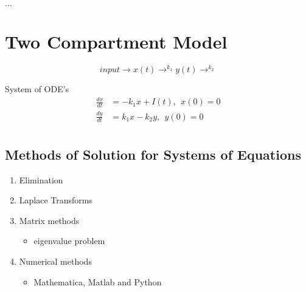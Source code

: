\documentclass[
	date={September 23{,} 2024},
	month={09},
	day={23}
]{math486notes}
\begin{document}
\tableofcontents

\begin{example}
	$\dots$
\end{example}

\section{Two Compartment Model}\label{sec:two-compartment-model}
\[ input \rightarrow x(t) \rightarrow^{k_{1}} y(t) \rightarrow^{k_{2}} \]

System of ODE's
\begin{equation*}
\begin{aligned}
	\frac{dx}{dt} &= -k_{1}x + I(t),\ \ x(0) = 0\\
	\frac{dy}{dt} &= k_{1}x - k_{2}y,\ \ y(0) = 0\\
\end{aligned}
\end{equation*}

\subsection{Methods of Solution for Systems of Equations}\label{subsec:methods-of-solution-for-systems-of-equations}
\begin{enumerate}[label=(\arabic*)]
	\item Elimination
	\item Laplace Transforms
	\item Matrix methods
	\begin{itemize}
		\item eigenvalue problem
	\end{itemize}
	\item Numerical methods
	\begin{itemize}
		\item Mathematica, Matlab and Python
	\end{itemize}
\end{enumerate}
\end{document}
